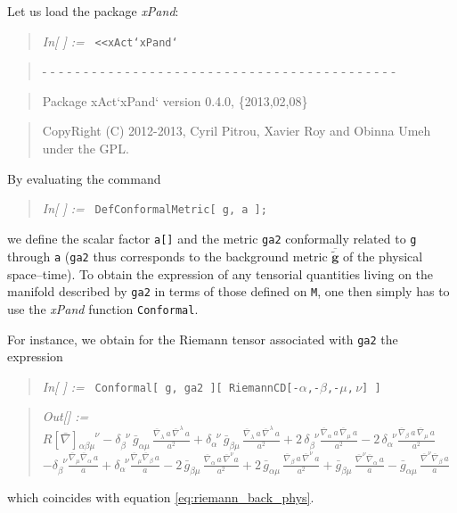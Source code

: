 \documentclass[notitlepage,onecolumn,floatfix,preprintnumbers,aps,prd,showpacs,nofootinbib,amsmath,amssymb,amsfonts]{revtex4-1}
\newcommand{\<}{\langle}
\renewcommand{\>}{\rangle}
\newcounter{inout}
\newcommand{\inoutput}{%
	\stepcounter{inout}%
	\theinout}
\newcommand{\mathIn}[1]{
	\begin{quotation} {\em In[\inoutput] :=\ } {\tt #1} \end{quotation}}
\newcommand{\mathOutTwoLines}[2]{
	\begin{quotation} {\em Out[\theinout] :=\ } {\tt #1} \\ 
	\phantom{\em Out[\theinout] := \quad \;\,}  {\tt #2}\end{quotation}}
\newcommand{\mathComment}[1]{
	\begin{quotation} \qquad \qquad #1 \end{quotation}}
\newcommand{\ttgr}[1]{{#1}}
\newcommand{\bb}{{\ttgr{\alpha}}}
\newcommand{\cc}{{\ttgr{\beta}}}
\newcommand{\ii}{{\ttgr{\mu}}}
\newcommand{\jj}{{\ttgr{\nu}}}
\begin{document}
Let us load the package \textit{xPand}: 
%
\mathIn{<<xAct`xPand`}
\vspace{-2mm}
\mathComment{- - - - - - - - - - - - - - - - - - - - - - - - - - - - - - - - - - - - - - - - - - -}
\vspace{-4mm}
\mathComment{Package xAct`xPand`  version 0.4.0, \{2013,02,08\}}
\mathComment{CopyRight (C) 2012-2013, Cyril Pitrou, Xavier Roy and Obinna Umeh under the GPL.}
%
By evaluating the command 
%
\mathIn{DefConformalMetric[ g, a ];}
%
we define the scalar factor {\tt a[]} and the metric {\tt ga2} conformally related to {\tt g} through {\tt a} 
({\tt ga2} thus corresponds to the background metric $\overline{\widetilde{\bm g}}$ of the physical space--time). 
To obtain the expression of any tensorial quantities living on the manifold described by {\tt ga2} in terms 
of those defined on {\tt M}, one then simply has to use the \textit{xPand} function {\tt Conformal}. 

For instance, we obtain for the Riemann tensor associated with {\tt ga2} the expression 
%
\mathIn{Conformal[ g, ga2 ][ RiemannCD[-$\alpha$,-$\beta$,-$\mu$,$\, \nu$] ]}
\mathOutTwoLines{$ \displaystyle 
	R \left[ \bar \nabla\right]{}_{\bb\cc\ii}^{\phantom{\bb\cc\ii}\jj}
- \delta_\cc^{\phantom{\cc} \jj} \, \bar g_{\bb\ii} \, \frac{\bar \nabla_{\lambda} \, a \, \bar \nabla^\lambda \, a}{a^2} 
+ \delta_\bb^{\phantom{\cc} \jj} \, \bar g_{\cc\ii} \, \frac{\bar \nabla_\lambda \, a \, \bar \nabla^\lambda \, a}{a^2} 
+ 2 \, \delta_\cc^{\phantom{\cc} \jj} \frac{\bar \nabla_\bb \, a \, \bar \nabla_\ii \, a}{a^2} 
- 2 \, \delta_\bb^{\phantom{\cc} \jj} \frac{\bar \nabla_\cc \, a \, \bar \nabla_\ii \, a}{a^2} $} 
{$ \displaystyle
- \delta_\cc^{\phantom{\cc} \jj} \frac{\bar \nabla_\ii \bar \nabla_\bb \, a}{a} 
+ \delta_\bb^{\phantom{\cc} \jj} \frac{\bar \nabla_\ii \bar \nabla_\cc \, a}{a} 
- 2 \, \bar g_{\cc\ii} \, \frac{\bar \nabla_\bb \, a \, \bar \nabla^\jj a}{a^2}
+ 2 \, \bar g_{\bb\ii} \, \frac{\bar \nabla_\cc \, a \, \bar \nabla^\jj \, a}{a^2} 
+ \bar g_{\cc\ii} \, \frac{\bar \nabla^\jj \bar \nabla_\bb \, a}{a} 
- \bar g_{\bb\ii} \, \frac{\bar \nabla^\jj \bar \nabla_\cc \, a}{a} $}
which coincides with equation \eqref{eq:riemann_back_phys}. 
\end{document}
